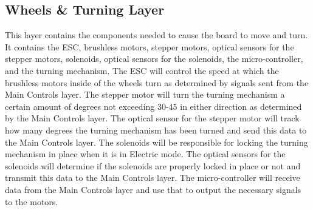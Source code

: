 \subsection{Wheels \& Turning Layer}
This layer contains the components needed to cause the board to move and turn. It contains the ESC, brushless motors, stepper motors, optical sensors for the stepper motors, solenoids, optical sensors for the solenoids, the micro-controller, and the turning mechanism. The ESC will control the speed at which the brushless motors inside of the wheels turn as determined by signals sent from the Main Controls layer. The stepper motor will turn the turning mechanism a certain amount of degrees not exceeding 30-45 in either direction as determined by the Main Controls layer. The optical sensor for the stepper motor will track how many degrees the turning mechanism has been turned and send this data to the Main Controls layer. The solenoids will be responsible for locking the turning mechanism in place when it is in Electric mode. The optical sensors for the solenoids will determine if the solenoids are properly locked in place or not and transmit this data to the Main Controls layer. The micro-controller will receive data from the Main Controls layer and use that to output the necessary signals to the motors. 
